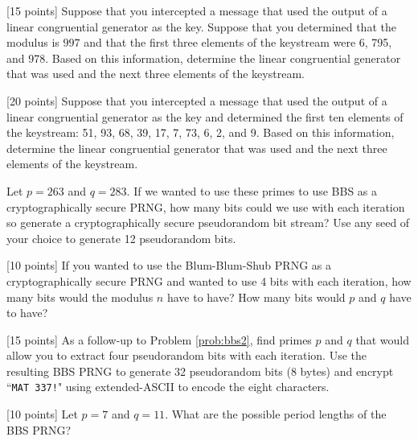 \begin{problem}
\label{prob:lincong5} [15 points] Suppose that you intercepted a message that used the output of a linear congruential generator  as the key. Suppose that you determined that the modulus is $997$ and that the first three elements of the keystream were 6, 795, and 978. Based on this information, determine the linear congruential generator that was used and the next three elements of the keystream.
\end{problem}

\begin{problem}
\label{prob:lincong6}  [20 points]
Suppose that you intercepted a message that used the output of a linear congruential generator  as the key and determined the first ten elements of the keystream: 51, 93, 68, 39, 17, 7, 73, 6, 2, and 9. Based on this information, determine the linear congruential generator that was used and the next three elements of the keystream.
\end{problem}

\begin{problem}  [10 points]
Let $p = 263$ and $q = 283$. If we wanted to use these primes to use BBS as a cryptographically secure PRNG, how many bits could we use with each iteration so generate a cryptographically secure pseudorandom bit stream? Use any seed of your choice to generate 12 pseudorandom bits.
\end{problem}

\begin{problem}
\label{prob:bbs2}  [10 points]
If you wanted to use the Blum-Blum-Shub PRNG as a cryptographically secure PRNG and wanted to use 4 bits with each iteration, how many bits would the modulus $n$ have to have? How many bits would $p$ and $q$ have to have?
\end{problem}

\begin{problem}
\label{prob:bbs3}  [15 points]
As a follow-up to Problem \ref{prob:bbs2}, find primes $p$ and $q$ that would allow you to extract four pseudorandom bits with each iteration. Use the resulting BBS PRNG to generate 32 pseudorandom bits (8 bytes) and encrypt ``{\tt MAT 337!}" using extended-ASCII to encode the eight characters.
\end{problem}

\begin{problem}
\label{prob:bbs4}  [10 points]
Let $p=7$ and $q=11$. What are the possible period lengths of the BBS PRNG?
\end{problem}

